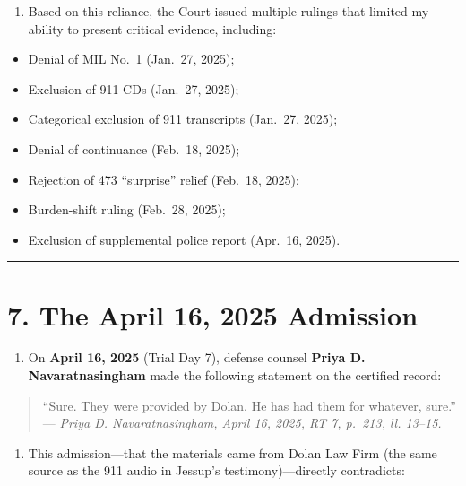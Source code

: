 \begin{enumerate}
\def\labelenumi{\arabic{enumi}.}
\setcounter{enumi}{15}
\tightlist
\item
  Based on this reliance, the Court issued multiple rulings that limited my ability to present critical evidence, including:
\end{enumerate}

\begin{itemize}
\tightlist
\item
  Denial of MIL No.~1 (Jan.~27, 2025);
\item
  Exclusion of 911 CDs (Jan.~27, 2025);
\item
  Categorical exclusion of 911 transcripts (Jan.~27, 2025);
\item
  Denial of continuance (Feb.~18, 2025);
\item
  Rejection of \textsection{} 473 ``surprise'' relief (Feb.~18, 2025);
\item
  Burden-shift ruling (Feb.~28, 2025);
\item
  Exclusion of supplemental police report (Apr.~16, 2025).
\end{itemize}

\begin{center}\rule{0.5\linewidth}{0.5pt}\end{center}

\section{7. The April 16, 2025 Admission}\label{the-april-16-2025-admission}

\begin{enumerate}
\def\labelenumi{\arabic{enumi}.}
\setcounter{enumi}{16}
\tightlist
\item
  On \textbf{April 16, 2025} (Trial Day 7), defense counsel \textbf{Priya D. Navaratnasingham} made the following statement on the certified record:
\end{enumerate}

\begin{quote}
``Sure. They were provided by Dolan. He has had them for whatever, sure.'' --- \emph{Priya D. Navaratnasingham, April 16, 2025, RT 7, p.~213, ll. 13--15.}
\end{quote}

\begin{enumerate}
\def\labelenumi{\arabic{enumi}.}
\setcounter{enumi}{17}
\tightlist
\item
  This admission---that the materials came from Dolan Law Firm (the same source as the 911 audio in Jessup's testimony)---directly contradicts:
\end{enumerate}

